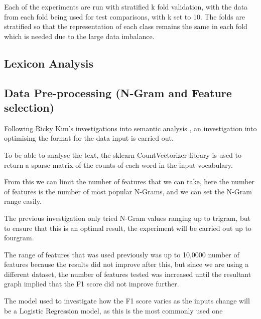 Each of the experiments are run with stratified k fold validation, with the data from each fold being used for test comparisons, with k set to 10. The folds are stratified so that the representation of each class remains the same in each fold which is needed due to the large data imbalance. \cite{kohavi1995study}


\subsection{Lexicon Analysis}


\subsection{Data Pre-processing (N-Gram and Feature selection)}

Following Ricky Kim's investigations into semantic analysis \cite{towardsDS}, an investigation into optimising the format for the data input is carried out. 

To be able to analyse the text, the sklearn CountVectorizer library is used to return a sparse matrix of the counts of each word in the input vocabulary. \cite{sklearn}

From this we can limit the number of features that we can take, here the number of features is the number of most popular N-Grams, and we can set the N-Gram range easily. 

The previous investigation only tried N-Gram values ranging up to trigram, but to ensure that this is an optimal result, the experiment will be carried out up to fourgram.

The range of features that was used previously was up to 10,0000 number of features because the results did not improve after this, but since we are using a different dataset, the number of features tested was increased until the resultant graph implied that the F1 score did not improve further. 

The model used to investigate how the F1 score varies as the inputs change will be a Logistic Regression model, as this is the most commonly used one 

